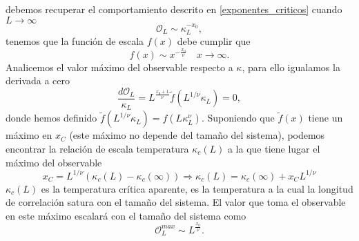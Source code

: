 debemos recuperar el comportamiento descrito en \ref{exponentes_criticos}
cuando $L\rightarrow \infty$ 
\begin{equation}
\mathcal{O}_L\sim \kappa_L^{-x_0},
\end{equation}
tenemos que la función de escala $f(x)$ debe cumplir que
\begin{equation}
f(x)\sim x^{-\frac{x_0}{\nu}}\quad x\rightarrow \infty.
\end{equation}
Analicemos el valor máximo del observable respecto a $\kappa$, para ello
igualamos la derivada a cero
\begin{equation}
\frac{d\mathcal{O}_L}{\kappa_L}=L^{\frac{x_0+1}{\nu}}\tilde{f}(L^{1/\nu} \kappa_L)=0,
\end{equation}
donde hemos definido $\tilde{f}(L^{1/\nu}\kappa_L)=f(L\kappa_L^{\nu})$. Suponiendo que
$\tilde{f}(x)$ tiene un máximo en $x_C$ (este máximo no depende del tamaño del
sistema), podemos encontrar la relación de escala
temperatura $\kappa_c(L)$ a la que tiene lugar el máximo del observable
\begin{equation}
x_C=L^{1/\nu}(\kappa_c(L)-\kappa_c(\infty))\Rightarrow \kappa_c(L)=\kappa_c(\infty)+x_CL^{1/\nu}
\end{equation}
$\kappa_c(L)$ es la temperatura crítica aparente, es la temperatura a la cual
la longitud de correlación satura con el tamaño del sistema. El valor que toma
el observable en este máximo escalará con el tamaño del sistema como
\begin{equation}
\mathcal{O}^{max}_L\sim L^{\frac{x_0}{\nu}}.
\end{equation}

